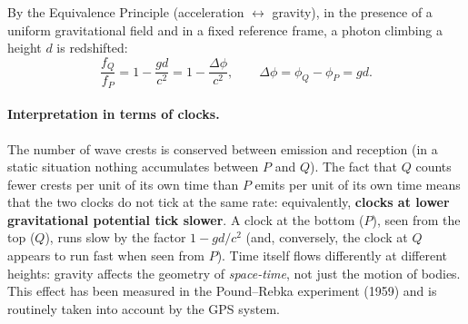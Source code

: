 \begin{keyresult}
By the Equivalence Principle (acceleration $\leftrightarrow$ gravity), in the presence of a uniform gravitational field and in a fixed reference frame, a photon climbing a height $d$ is redshifted:
\begin{equation}
  \frac{f_Q}{f_P} = 1-\frac{g d}{c^2} = 1-\frac{\Delta\phi}{c^2},\qquad \Delta\phi=\phi_Q-\phi_P = g d .
\end{equation}
\end{keyresult}

\paragraph{Interpretation in terms of clocks.} The number of wave crests is conserved between emission and reception (in a static situation nothing accumulates between $P$ and $Q$). The fact that $Q$ counts fewer crests per unit of its own time than $P$ emits per unit of its own time means that the two clocks do not tick at the same rate: equivalently, \textbf{clocks at lower gravitational potential tick slower}. A clock at the bottom ($P$), seen from the top ($Q$), runs slow by the factor $1-gd/c^2$ (and, conversely, the clock at $Q$ appears to run fast when seen from $P$). Time itself flows differently at different heights: gravity affects the geometry of \emph{space-time}, not just the motion of bodies. This effect has been measured in the Pound--Rebka experiment (1959) and is routinely taken into account by the GPS system.
